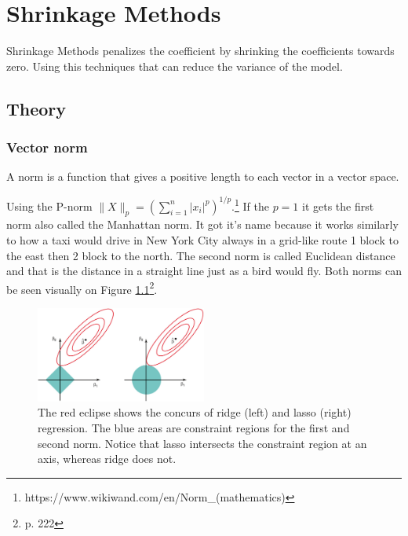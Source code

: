 \chapter{Shrinkage Methods} \label{ch:shrinkageMethods}
Shrinkage Methods penalizes the coefficient by shrinking the coefficients towards zero. Using this techniques that can reduce the variance of the model. 

\section{Theory}
\subsection{Vector norm}
A norm is a function that gives a positive length to each vector in a vector space.

\noindent Using the P-norm $\lVert X \rVert_p = (\sum_{i=1}^{n}|x_i|^p)^{1/p}$.\footnote{https://www.wikiwand.com/en/Norm\_(mathematics)} If the  $ p = 1 $ it gets the first norm also called the Manhattan norm. It got it's name because it works similarly to how a taxi would drive in New York City always in a grid-like route 1 block to the east then 2 block to the north. The second norm is called Euclidean distance and that is the distance in a straight line just as a bird would fly. Both norms can be seen visually on Figure \ref{fig:normfirstsecond}\footnote{\cite{James2013} p. 222}.

\begin{figure}[H]
	\centering
	\includegraphics[width=0.5\textwidth]{shrinkageMethods/fig/normsL1_L2.jpg}
	\caption{The red eclipse shows the concurs of ridge (left) and lasso (right) regression. The blue areas are constraint regions for the first and second norm. Notice that lasso intersects the constraint region at an axis, whereas ridge does not.}
	\label{fig:normfirstsecond}
\end{figure}

